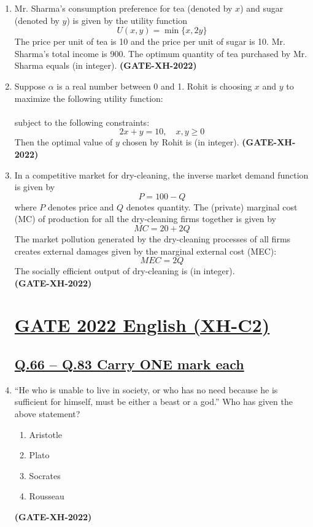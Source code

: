 \documentclass[journal]{IEEEtran}
\begin{document}
\begin{enumerate}
\item Mr. Sharma’s consumption preference for tea (denoted by $x$) and sugar (denoted by $y$) is given by the utility function  
\[
U(x, y) = \min\{x, 2y\}
\]
The price per unit of tea is 10 and the price per unit of sugar is 10. Mr. Sharma’s total income is 900. The optimum quantity of tea purchased by Mr. Sharma equals \underline{\hspace{2cm}} (in integer).
\hfill\textbf{(GATE-XH-2022)}
\vspace{0.2cm}

\item Suppose $\alpha$ is a real number between 0 and 1. Rohit is choosing $x$ and $y$ to maximize the following utility function:\\  
{}\\
subject to the following constraints:  
\[
2x + y = 10,\quad x, y \geq 0
\]
Then the optimal value of $y$ chosen by Rohit is \underline{\hspace{1cm}} (in integer). 
\hfill\textbf{(GATE-XH-2022)}
\vspace{0.2cm}

\item In a competitive market for dry-cleaning, the inverse market demand function is given by
\[
P = 100 - Q
\]
where $P$ denotes price and $Q$ denotes quantity. The (private) marginal cost (MC) of production for all the dry-cleaning firms together is given by
\[
MC = 20 + 2Q
\]
The market pollution generated by the dry-cleaning processes of all firms creates external damages given by the marginal external cost (MEC):
\[
MEC = 2Q
\]
The socially efficient output of dry-cleaning is \underline{\hspace{2cm}} (in integer).\\
\hfill\textbf{(GATE-XH-2022)}
\newpage
\section*{\large \underline{\textbf {GATE 2022 English (XH-C2)}}}
\subsection*{ \underline{\textbf {Q.66 – Q.83 Carry ONE mark each}}}

\item ``He who is unable to live in society, or who has no need because he is sufficient for himself, must be either a beast or a god.''  
Who has given the above statement?
\begin{multicols}{4}
\begin{enumerate}
\item Aristotle
\item Plato
\item Socrates
\item Rousseau
\end{enumerate}
\end{multicols}
\hfill\textbf{(GATE-XH-2022)}


\end{enumerate}
\end{document}
